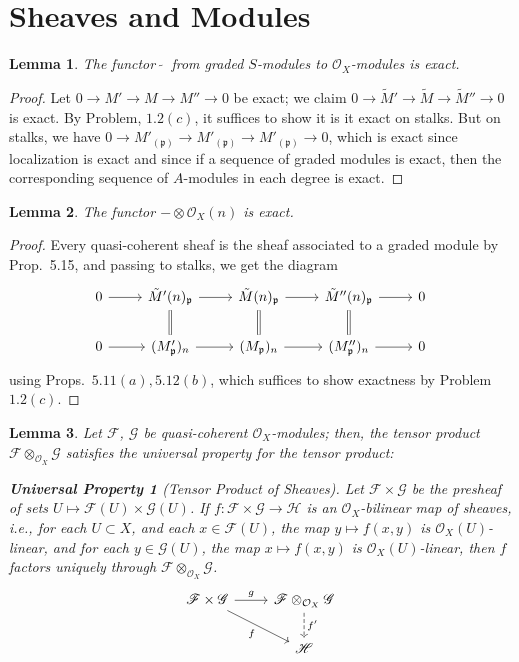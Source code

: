 \documentclass[12pt,letterpaper]{article}
\newtheorem*{universalproperty}{Universal Property}
\newtheorem{lemma}{Lemma}[section]
\theoremstyle{definition}
\theoremstyle{remark}
\numberwithin{equation}{section}
\numberwithin{figure}{problem}
\newcommand{\FF}{\mathscr{F}}
\newcommand{\GG}{\mathscr{G}}
\newcommand{\HH}{\mathscr{H}}
\newcommand{\OO}{\mathcal{O}}
\begin{document}
\section{Sheaves and Modules}
\begin{lemma}\label{tildeexact}
  The functor $\:\tilde{}\:$ from graded $S$-modules to $\OO_X$-modules is exact.
\end{lemma}
\begin{proof}
  Let $0 \to M' \to M \to M'' \to 0$ be exact; we claim $0 \to \tilde{M}' \to \tilde{M} \to \tilde{M}'' \to 0$ is exact. By Problem, $1.2(c)$, it suffices to show it is it exact on stalks. But on stalks, we have $0 \to M'_{(\mathfrak{p})} \to M'_{(\mathfrak{p})} \to M'_{(\mathfrak{p})} \to 0$, which is exact since localization is exact \cite[Prop.~3.3]{AM69} and since if a sequence of graded modules is exact, then the corresponding sequence of $A$-modules in each degree is exact.
\end{proof}
\begin{lemma}\label{twistexact}
  The functor $- \otimes \OO_X(n)$ is exact.
\end{lemma}
\begin{proof}
   Every quasi-coherent sheaf is the sheaf associated to a graded module by Prop.~5.15, and passing to stalks, we get the diagram
  \begin{equation*}
    \begin{tikzcd}
      0 \rar & \tilde{M}'(n)_{\mathfrak{p}} \rar\dar[equals] & \tilde{M}(n)_{\mathfrak{p}} \rar\dar[equals] & \tilde{M}''(n)_{\mathfrak{p}} \rar\dar[equals] & 0\\
      0 \rar & (M'_{\mathfrak{p}})_n \rar & (M_{\mathfrak{p}})_n \rar & (M''_{\mathfrak{p}})_n \rar & 0
    \end{tikzcd}
  \end{equation*}
  using Props.~$5.11(a),5.12(b)$, which suffices to show exactness by Problem $1.2(c)$.
\end{proof}
\begin{lemma}\label{tensorup}
  Let $\FF$, $\GG$ be quasi-coherent $\OO_X$-modules; then, the tensor product $\FF \otimes_{\OO_X} \GG$ satisfies the universal property for the tensor product:
  \begin{universalproperty}[Tensor Product of Sheaves]
    Let $\FF \times \GG$ be the presheaf of sets $U \mapsto \FF(U) \times \GG(U)$. If $f\colon\FF \times \GG \to \HH$ is an $\OO_X$-bilinear map of sheaves, i.e., for each $U \subset X$, and each $x \in \FF(U)$, the map $y \mapsto f(x,y)$ is $\OO_X(U)$-linear, and for each $y \in \GG(U)$, the map $x \mapsto f(x,y)$ is $\OO_X(U)$-linear, then $f$ factors uniquely through $\FF \otimes_{\OO_X} \GG$.
    \begin{equation*}
      \begin{tikzcd}
        \FF \times \GG \rar{g}\arrow{dr}[swap]{f} & \FF \otimes_{\OO_X} \GG\dar[dashed]{f'}\\
        & \HH
      \end{tikzcd}
    \end{equation*}
  \end{universalproperty}
\end{lemma}
\end{document}
